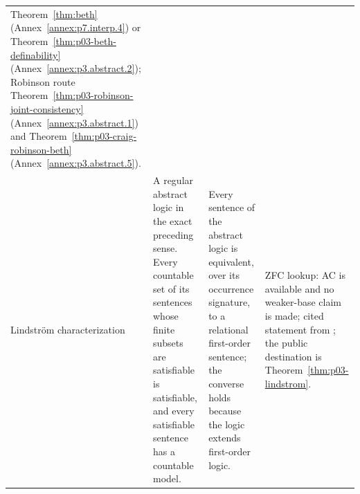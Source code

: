 \begin{landscape}
\begin{longtable}{@{}p{1.15in}p{2.15in}p{2.25in}p{1.65in}@{}}
Theorem~\ref{thm:beth} (Annex~\ref{annex:p7.interp.4}) or
Theorem~\ref{thm:p03-beth-definability} (Annex~\ref{annex:p3.abstract.2});
Robinson route Theorem~\ref{thm:p03-robinson-joint-consistency}
(Annex~\ref{annex:p3.abstract.1}) and
Theorem~\ref{thm:p03-craig-robinson-beth} (Annex~\ref{annex:p3.abstract.5}). \\
\addlinespace
Lindstr\"om characterization &
A regular abstract logic in the exact preceding sense.  Every countable set of
its sentences whose finite subsets are satisfiable is satisfiable, and every
satisfiable sentence has a countable model. &
Every sentence of the abstract logic is equivalent, over its occurrence
signature, to a relational first-order sentence; the converse holds because
the logic extends first-order logic. &
ZFC lookup: AC is available and no weaker-base claim is made; cited statement
from \cite{Lindstrom1969,EbbinghausFlumThomas1994}; the public destination is
Theorem~\ref{thm:p03-lindstrom}. \\
\bottomrule
\end{longtable}
\endgroup
\end{landscape}
